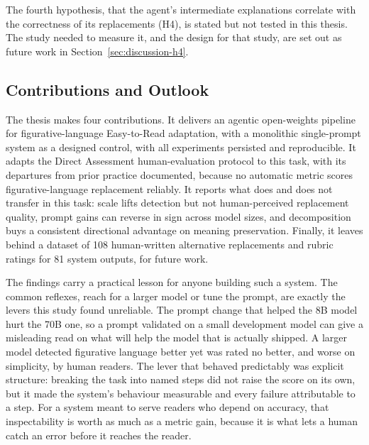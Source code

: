 The fourth hypothesis, that the agent's intermediate explanations correlate with
the correctness of its replacements (H4), is stated but not tested in this
thesis. The study needed to measure it, and the design for that study, are set
out as future work in Section~\ref{sec:discussion-h4}.

\subsection{Contributions and Outlook}

The thesis makes four contributions. It delivers an agentic open-weights
pipeline for figurative-language Easy-to-Read adaptation, with a monolithic
single-prompt system as a designed control, with all experiments persisted and
reproducible. It adapts the Direct Assessment human-evaluation protocol to
this task, with its departures from prior practice documented, because no
automatic metric scores figurative-language replacement reliably. It reports
what does and does not transfer in this task: scale lifts detection but not
human-perceived replacement quality, prompt gains can reverse in sign across
model sizes, and decomposition buys a consistent directional advantage on
meaning preservation. Finally, it leaves behind a dataset of 108 human-written
alternative replacements and rubric ratings for 81 system outputs, for future
work.

The findings carry a practical lesson for anyone building such a system. The
common reflexes, reach for a larger model or tune the prompt, are exactly the
levers this study found unreliable. The prompt change that helped the 8B model
hurt the 70B one, so a prompt validated on a small development model can give a
misleading read on what will help the model that is actually shipped. A larger
model detected figurative language better yet was rated no better, and worse on
simplicity, by human readers. The lever that behaved predictably was explicit
structure: breaking the task into named steps did not raise the score on its
own, but it made the system's behaviour measurable and every failure
attributable to a step. For a system meant to serve readers who depend on
accuracy, that inspectability is worth as much as a metric gain, because it is
what lets a human catch an error before it reaches the reader.

